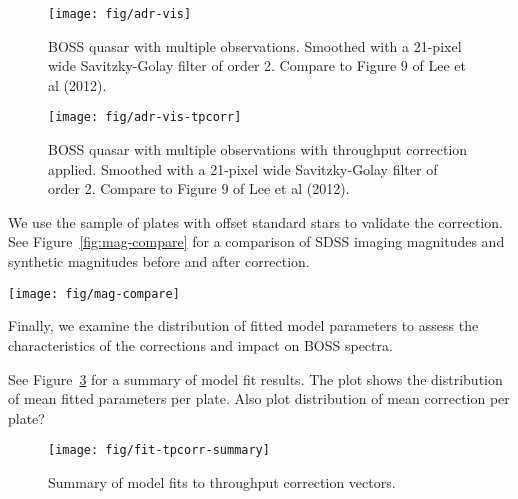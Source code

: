 \documentclass{emulateapj}
\providecommand{\fig}[1]{Figure~\ref{fig:#1}}
\begin{document}
\begin{figure}
\centering
\texttt{[image: fig/adr-vis]}
\caption{BOSS quasar with multiple observations. Smoothed with a 21-pixel wide Savitzky-Golay filter of order 2. Compare to Figure 9 of Lee et al (2012).}
\label{fig:adr-vis}
\end{figure}

\begin{figure}
\centering
\texttt{[image: fig/adr-vis-tpcorr]}
\caption{BOSS quasar with multiple observations with throughput correction applied. Smoothed with a 21-pixel wide Savitzky-Golay filter of order 2. Compare to Figure 9 of Lee et al (2012).}
\label{fig:adr-vis-tpcorr}
\end{figure}

We use the sample of plates with offset standard stars to validate the correction. See \fig{mag-compare} for a comparison of SDSS imaging magnitudes and synthetic magnitudes before and after correction.

\begin{figure*}
\centering
\texttt{[image: fig/mag-compare]}
\caption{The difference between the synthetic photometry computed from BOSS spectra and the measured photometry from the SDSS imaging data for subsets of stars with SDSS $g < 19$ from a sample of 20 plates that have at least 10 \texttt{ANCILLARY\_TARGET2 \& 1<<20 != 0} in each spectrograph. The black, blue, and red lines indicate $X_{synthetic} - X_{PSF}$ offsets for the $g$, $r$, and $i$ filters respectively. The insets in each panel show statistics for the $g$ filter offsets. Top-Left: Spectrophotometric standard stars (Compare directly top-left panel of Figure 8. in Dawson (2012).) Top-Right: \texttt{ANCILLARY\_TARGET2 \& 1<<20 != 0} stars. Bottom-Left: \texttt{ANCILLARY\_TARGET2 \& 1<<20 != 0} stars, from ``blue'' reduction. Bottom-Right: \texttt{ANCILLARY\_TARGET2 \& 1<<20 != 0} stars, with throughput correction applied.}
\label{fig:mag-compare}
\end{figure*}

Finally, we examine the distribution of fitted model parameters to assess the characteristics of the corrections and impact on BOSS spectra.

See \fig{fit-tpcorr-summary} for a summary of model fit results. The plot shows the distribution of mean fitted parameters per plate. Also plot distribution of mean correction per plate?

\begin{figure}
\centering
\texttt{[image: fig/fit-tpcorr-summary]}
\caption{Summary of model fits to throughput correction vectors.}
\label{fig:fit-tpcorr-summary}
\end{figure}
\end{document}
